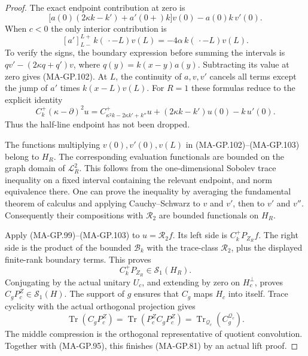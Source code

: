 \begin{proof}
The exact endpoint contribution at zero is
\[
 \bigl[a(0)(2\kappa k-k')+a'(0+)k\bigr]v(0)
                                  -a(0)k\,v'(0).
 \tag{MA-GP.102}
\]
When $c<0$ the only interior contribution is
\[
          [a']_{L-}^{L+}\,k(\,\cdot-L)v(L)
                      =-4\alpha\,k(\,\cdot-L)v(L).
 \tag{MA-GP.103}
\]
To verify the signs, the boundary expression before summing
the intervals is
$qv'-(2\kappa q+q')v$, where $q(y)=k(x-y)a(y)$.
Subtracting its value at zero gives (MA-GP.102).
At $L$, the continuity of $a,v,v'$ cancels all terms
except the jump of $a'$ times $k(x-L)v(L)$.
For $R=1$ these formulas reduce to the explicit identity
\[
 C_k^+(\kappa-\partial)^2u
  =C_{\kappa^2k-2\kappa k'+k''}^+u
                 +(2\kappa k-k')u(0)-k\,u'(0).
 \tag{MA-GP.104}
\]
Thus the half-line endpoint has not been dropped.

The functions multiplying $v(0),v'(0),v(L)$ in
(MA-GP.102)--(MA-GP.103) belong to $H_R$.
The corresponding evaluation functionals are bounded
on the graph domain of $\mathcal L_R^2$.
This follows from the one-dimensional Sobolev trace
inequality on a fixed interval containing the relevant
endpoint, and norm equivalence there.  One can prove
the inequality by averaging the fundamental theorem
of calculus and applying Cauchy--Schwarz to $v$ and
$v'$, then to $v'$ and $v''$.
Consequently their compositions with $\mathcal R_2$
are bounded functionals on $H_R$.

Apply (MA-GP.99)--(MA-GP.103) to
$u=\mathcal R_2f$.  Its left side is $C_k^+P_{Z_R}f$.
The right side is the product of the bounded
$\mathcal B_k$ with the trace-class $\mathcal R_2$,
plus the displayed finite-rank boundary terms.
This proves
\[
                         C_k^+P_{Z_R}\in\mathcal S_1(H_R).
 \tag{MA-GP.105}
\]
Conjugating by the actual unitary $U_c$, and extending by
zero on $H_c^\perp$, proves $C_gP_c^Z\in\mathcal S_1(H)$.
The support of $g$ ensures that $C_g$ maps $H_c$ into itself.
Trace cyclicity with the actual orthogonal projection gives
\[
 \operatorname{Tr}(C_gP_c^Z)
       =\operatorname{Tr}(P_c^ZC_gP_c^Z)
       =\operatorname{Tr}_{\mathcal Q_c}(C_g^{\mathcal Q_c}).
 \tag{MA-GP.106}
\]
The middle compression is the orthogonal representative
of quotient convolution.  Together with (MA-GP.95),
this finishes (MA-GP.81) by an actual lift proof.


\end{proof}
